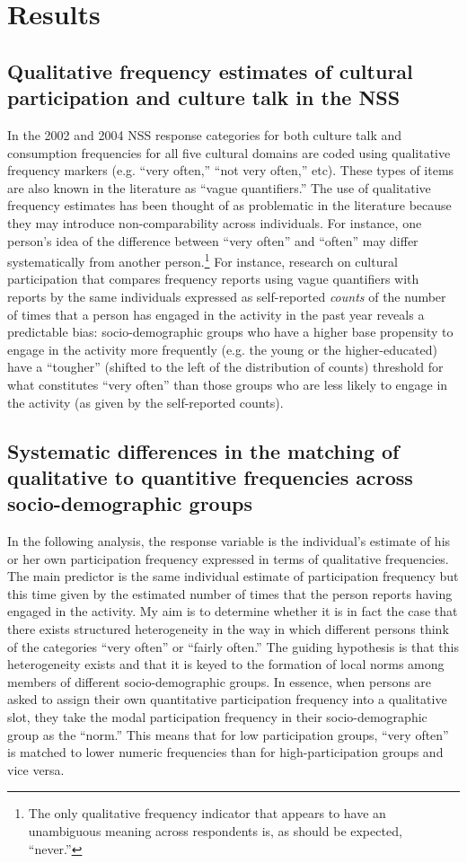 \documentclass[11pt]{article}
\begin{document}
\section{Results}
\subsection{Qualitative frequency estimates of cultural participation and culture talk in the NSS}
In the 2002 and 2004 NSS response categories for both culture talk and consumption frequencies for all five cultural domains are coded using qualitative frequency markers (e.g. ``very often,'' ``not very often,'' etc).  These types of items are also known in the literature as ``vague quantifiers.'' The use of qualitative frequency estimates has been thought of as problematic in the literature because they may introduce non-comparability across individuals.  For instance, one person's idea of the difference between ``very often'' and ``often'' may differ systematically from another person.\footnote{The only qualitative frequency indicator that appears to have an unambiguous meaning across respondents is, as should be expected, ``never.''}  For instance, research on cultural participation that compares frequency reports using vague quantifiers with reports by the same individuals expressed as self-reported \textit{counts} of the number of times that a person has engaged in the activity in the past year reveals a predictable bias:  socio-demographic groups who have a higher base propensity to engage in the activity more frequently (e.g. the young or the higher-educated) have a ``tougher'' (shifted to the left of the distribution of counts) threshold for what constitutes ``very often'' than those groups who are less likely to engage in the activity (as given by the self-reported counts).  

\subsection{Systematic differences in the matching of qualitative to quantitive frequencies across socio-demographic groups}
In the following analysis, the response variable is the individual's estimate of his or her own participation frequency expressed in terms of qualitative frequencies.  The main predictor is the same individual estimate of participation frequency but this time given by the estimated number of times that the person reports having engaged in the activity. My aim is to determine whether it is in fact the case that there exists structured heterogeneity in the way in which different persons think of the categories ``very often'' or ``fairly often.''  The guiding hypothesis is that this heterogeneity exists and that it is keyed to the formation of local norms among members of different socio-demographic groups.  In essence, when persons are asked to assign their own quantitative participation frequency into a qualitative slot, they take the modal participation frequency in their socio-demographic group as the ``norm.''  This means that for low participation groups, ``very often'' is matched to lower numeric frequencies than for high-participation groups and vice versa.
\end{document}

